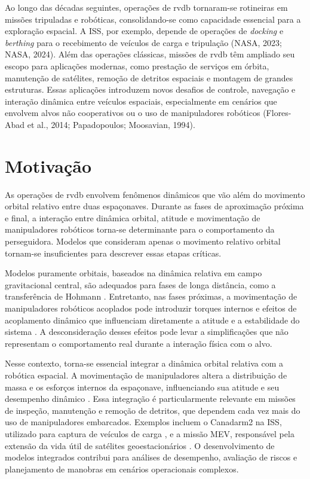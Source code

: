 Ao longo das décadas seguintes, operações de \gls{rvdb} tornaram-se rotineiras em missões tripuladas e robóticas, consolidando-se como capacidade essencial para a exploração espacial. A ISS, por exemplo, depende de operações de \textit{docking} e \textit{berthing} para o recebimento de veículos de carga e tripulação (NASA, 2023; NASA, 2024). Além das operações clássicas, missões de \gls{rvdb} têm ampliado seu escopo para aplicações modernas, como prestação de serviços em órbita, manutenção de satélites, remoção de detritos espaciais e montagem de grandes estruturas. Essas aplicações introduzem novos desafios de controle, navegação e interação dinâmica entre veículos espaciais, especialmente em cenários que envolvem alvos não cooperativos ou o uso de manipuladores robóticos (Flores-Abad et al., 2014; Papadopoulos; Moosavian, 1994).


\section{Motivação}

As operações de \gls{rvdb} envolvem fenômenos dinâmicos que vão além do movimento orbital relativo entre duas espaçonaves.
Durante as fases de aproximação próxima e final, a interação entre dinâmica orbital, atitude e movimentação de manipuladores robóticos torna-se determinante para o comportamento da perseguidora. Modelos que consideram apenas o movimento relativo orbital tornam-se insuficientes para descrever essas etapas críticas.

Modelos puramente orbitais, baseados na dinâmica relativa em campo gravitacional central, são adequados para fases de longa distância, como a transferência de Hohmann \cite{weberHohmann}.
Entretanto, nas fases próximas, a movimentação de manipuladores robóticos acoplados pode introduzir torques internos e efeitos de acoplamento dinâmico que influenciam diretamente a atitude e a estabilidade do sistema \cite{nardin2017_simulador}.
A desconsideração desses efeitos pode levar a simplificações que não representam o comportamento real durante a interação física com o alvo.

Nesse contexto, torna-se essencial integrar a dinâmica orbital relativa com a robótica espacial.
A movimentação de manipuladores altera a distribuição de massa e os esforços internos da espaçonave, influenciando sua atitude e seu desempenho dinâmico \cite{yoshida_reactionless_etsvii}.
Essa integração é particularmente relevante em missões de inspeção, manutenção e remoção de detritos, que dependem cada vez mais do uso de manipuladores embarcados. Exemplos incluem o Canadarm2 na ISS, utilizado para captura de veículos de carga \cite{canadarm2}, e a missão MEV, responsável pela extensão da vida útil de satélites geoestacionários \cite{mev_northrop}.
O desenvolvimento de modelos integrados contribui para análises de desempenho, avaliação de riscos e planejamento de manobras em cenários operacionais complexos.

